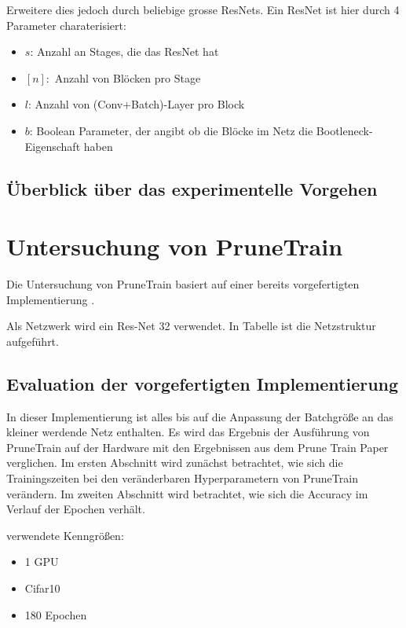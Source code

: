 Erweitere dies jedoch durch beliebige grosse ResNets. Ein ResNet ist hier durch 4 Parameter charaterisiert:

\begin{itemize}
 \item $s$: Anzahl an Stages, die das ResNet hat
 \item $[n]:$ Anzahl von Blöcken pro Stage 
 \item $l$: Anzahl von (Conv+Batch)-Layer pro Block
 \item $b$: Boolean Parameter, der angibt ob die Blöcke im Netz die Bootleneck-Eigenschaft haben
\end{itemize}
\subsection{Überblick über das experimentelle Vorgehen}


\section{Untersuchung von PruneTrain}\label{sec:ptexperimente}
\color{blue1}
Die Untersuchung von PruneTrain basiert auf einer bereits vorgefertigten Implementierung \cite{ptImpl}. 


Als Netzwerk wird ein Res-Net 32 verwendet. In Tabelle  ist die Netzstruktur aufgeführt.


\subsection{Evaluation der vorgefertigten Implementierung}
In dieser Implementierung ist alles bis auf die Anpassung der Batchgröße an das kleiner werdende Netz enthalten. Es wird das Ergebnis der Ausführung von PruneTrain auf der Hardware mit den Ergebnissen aus dem Prune Train Paper verglichen. Im ersten Abschnitt wird zunächst betrachtet, wie sich die Trainingszeiten bei den veränderbaren Hyperparametern von PruneTrain verändern. Im zweiten Abschnitt wird betrachtet, wie sich die Accuracy im Verlauf der Epochen verhält.




verwendete Kenngrößen:

\begin{itemize}
 \item 1 GPU
 \item Cifar10
 \item 180 Epochen
\end{itemize}

